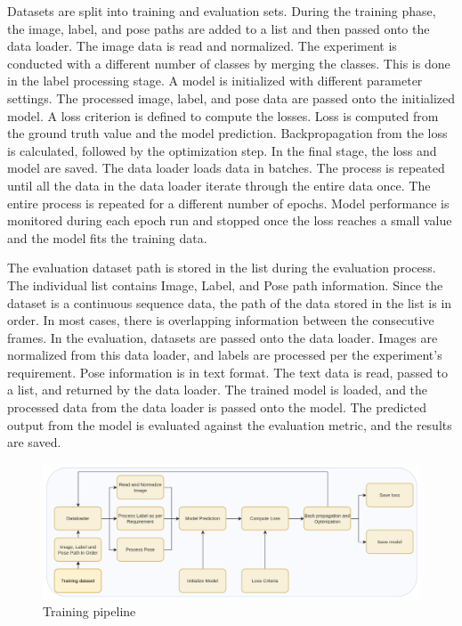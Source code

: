     Datasets are split into training and evaluation sets. During the training phase, the image, label, and pose paths are added to a list and then passed onto the data loader. The image data is read and normalized. The experiment is conducted with a different number of classes by merging the classes. This is done in the label processing stage. A model is initialized with different parameter settings. The processed image, label, and pose data are passed onto the initialized model. A loss criterion is defined to compute the losses. Loss is computed from the ground truth value and the model prediction. Backpropagation from the loss is calculated, followed by the optimization step. In the final stage, the loss and model are saved. The data loader loads data in batches. The process is repeated until all the data in the data loader iterate through the entire data once. The entire process is repeated for a different number of epochs. Model performance is monitored during each epoch run and stopped once the loss reaches a small value and the model fits the training data. 

	The evaluation dataset path is stored in the list during the evaluation process. The individual list contains Image, Label, and Pose path information. Since the dataset is a continuous sequence data, the path of the data stored in the list is in order. In most cases, there is overlapping information between the consecutive frames. In the evaluation, datasets are passed onto the data loader. Images are normalized from this data loader, and labels are processed per the experiment's requirement. Pose information is in text format. The text data is read, passed to a list, and returned by the data loader. The trained model is loaded, and the processed data from the data loader is passed onto the model. The predicted output from the model is evaluated against the evaluation metric, and the results are saved.      
    
    
   	\begin{figure}
    	\centering
    	\includegraphics[width=14cm]{images/training.png}
    	\caption{Training pipeline}
    	\label{fig:unet_training}
    \end{figure}

